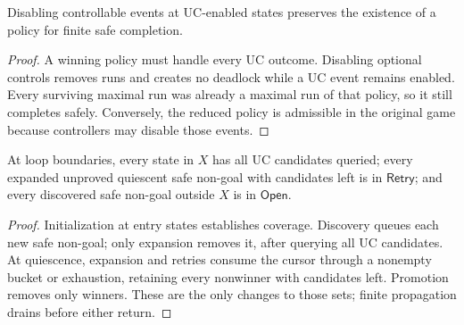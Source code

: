 \begin{lemma}[UC priority]
\label{lem:uc-priority}
Disabling controllable events at UC-enabled states preserves the existence of a policy for finite safe completion.
\end{lemma}
\begin{proof}
A winning policy must handle every UC outcome. Disabling optional controls removes runs and creates no deadlock while a UC event remains enabled. Every surviving maximal run was already a maximal run of that policy, so it still completes safely. Conversely, the reduced policy is admissible in the original game because controllers may disable those events.
\end{proof}

\begin{lemma}
\label{lem:search-coverage}
At loop boundaries, every state in $X$ has all UC candidates queried; every expanded unproved quiescent safe non-goal with candidates left is in $\mathsf{Retry}$; and every discovered safe non-goal outside $X$ is in $\mathsf{Open}$.
\end{lemma}
\begin{proof}
Initialization at entry states establishes coverage. Discovery queues each new safe non-goal; only expansion removes it, after querying all UC candidates. At quiescence, expansion and retries consume the cursor through a nonempty bucket or exhaustion, retaining every nonwinner with candidates left. Promotion removes only winners. These are the only changes to those sets; finite propagation drains before either return.
\end{proof}



